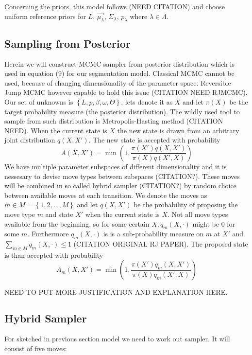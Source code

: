 \documentclass{article}
\begin{document}
Concerning the priors, this model follows (NEED CITATION) and choose uniform reference priors for $L$, $\vec{\mu_{\lambda}}$, $\Sigma_{\lambda}$, $p_{\lambda}$ where $\lambda \in \Lambda$.

\subsection{Sampling from Posterior}
Herein we will construct MCMC sampler from posterior distribution which is used in equation (9) for our segmentation model. Classical MCMC cannot be used, because of changing dimensionality of the parameter space. Reversible Jump MCMC however capable to hold this issue (CITATION NEED RJMCMC). Our set of unknowns is $\left\{L,p,\beta,\omega,\Theta\right\}$, lets denote it as $X$ and let $\pi\left(X\right)$ be the target probability measure (the posterior distribution). The wildly used tool to sample from such distribution is Metropolis-Hasting method (CITATION NEED). When the current state is $X$ the new state is drawn from an arbitrary joint distribution $q\left(X,X'\right)$. The new state is accepted with probability 
\begin{equation}
A(X,X') = \min\left(1,
\frac{\pi\left(X'\right)q\left(X,X'\right)}
{\pi\left(X\right)q\left(X',X\right)}\right)
\end{equation}
We have multiple parameter subspaces of different dimensionality and it is nessesary to devise move types between subspaces (CITATION?). These moves will be combined in so called hybrid sampler (CITATION?) by random choice between available moves at each transition. We denote the moves as $m \in M = \left\{1,2,...,M\right\}$ and let $q\left(X,X'\right)$ be the probability of proposing the move type $m$ and state $X'$ when the current state is $X$. Not all move types available from the beginning, so for some certain $X, q_{m}\left(X,\cdot\right)$ might be $0$ for some $m$. Furthermore $ q_{m}\left(X,\cdot\right)$ is is a sub-probability measure on $m$ at $X'$ and $\sum\limits_{m \in M} q_{m}\left(X,\cdot\right) \leq 1$ (CITATION ORIGINAL RJ PAPER). The proposed state is than accepted with probability 
\begin{equation}
A_{m}(X,X') = \min\left(1,
\frac{\pi\left(X'\right)q_{m}\left(X,X'\right)}
{\pi\left(X\right)q_{m}\left(X',X\right)}\right)
\end{equation}

NEED TO PUT MORE JUSTIFICATION AND EXPLANATION HERE.

\subsection{Hybrid Sampler}
For sketched in previous section model we need to work out sampler. It will consist of five moves:
\end{document}

